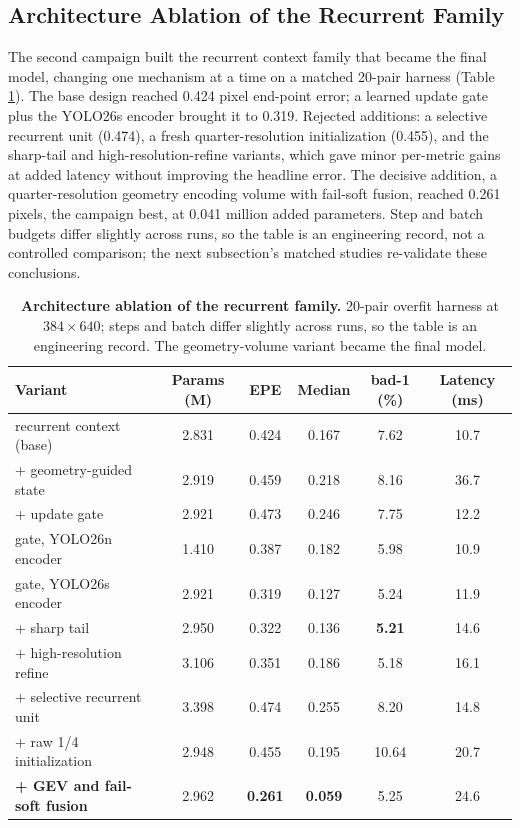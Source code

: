 \subsection{Architecture Ablation of the Recurrent Family}
The second campaign built the recurrent context family that became the
final model, changing one mechanism at a time on a matched 20-pair
harness (Table \ref{tab:ablation_gev4line}). The base design reached
0.424 pixel end-point error; a learned update gate plus the YOLO26s
encoder brought it to 0.319. Rejected additions: a selective recurrent
unit (0.474), a fresh quarter-resolution initialization (0.455), and
the sharp-tail and high-resolution-refine variants, which gave minor
per-metric gains at added latency without improving the headline
error. The decisive addition, a quarter-resolution geometry encoding
volume with fail-soft fusion, reached 0.261 pixels, the campaign best,
at 0.041 million added parameters. Step and batch budgets differ
slightly across runs, so the table is an engineering record, not a
controlled comparison; the next subsection's matched studies
re-validate these conclusions.

\begin{table}[!htbp]
\centering
\caption{\textbf{Architecture ablation of the recurrent family.} 20-pair overfit harness at $384\times 640$; steps and batch differ slightly across runs, so the table is an engineering record. The geometry-volume variant became the final model.}
\label{tab:ablation_gev4line}
\small
\begin{tabular}{lccccc}
\toprule
Variant & Params (M) & EPE & Median & bad-1 (\%) & Latency (ms)\\
\midrule
recurrent context (base) & 2.831 & 0.424 & 0.167 & 7.62 & 10.7\\
+ geometry-guided state & 2.919 & 0.459 & 0.218 & 8.16 & 36.7\\
+ update gate & 2.921 & 0.473 & 0.246 & 7.75 & 12.2\\
gate, YOLO26n encoder & 1.410 & 0.387 & 0.182 & 5.98 & 10.9\\
gate, YOLO26s encoder & 2.921 & 0.319 & 0.127 & 5.24 & 11.9\\
+ sharp tail & 2.950 & 0.322 & 0.136 & \textbf{5.21} & 14.6\\
+ high-resolution refine & 3.106 & 0.351 & 0.186 & 5.18 & 16.1\\
+ selective recurrent unit & 3.398 & 0.474 & 0.255 & 8.20 & 14.8\\
+ raw 1/4 initialization & 2.948 & 0.455 & 0.195 & 10.64 & 20.7\\
\textbf{+ GEV and fail-soft fusion} & 2.962 & \textbf{0.261} & \textbf{0.059} & 5.25 & 24.6\\
\bottomrule
\end{tabular}
\end{table}

